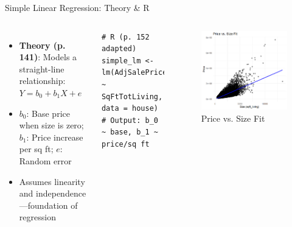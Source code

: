 \documentclass{beamer}
\begin{document}
	\begin{frame}[fragile]{Simple Linear Regression: Theory \& R}
		\begin{columns}
			\begin{itemize}
				\item \textbf{Theory (p. 141)}: Models a straight-line relationship: $Y = b_0 + b_1X + e$
				\item $b_0$: Base price when size is zero; $b_1$: Price increase per sq ft; $e$: Random error
				\item Assumes linearity and independence—foundation of regression
			\end{itemize}
			\begin{lstlisting}
# R (p. 152 adapted)
simple_lm <- lm(AdjSalePrice ~ SqFtTotLiving, data = house)
# Output: b_0 ~ base, b_1 ~ price/sq ft
			\end{lstlisting}
		\begin{figure}
			\centering
			\includegraphics[width=\textwidth]{regres1.jpg} %
			\caption{Price vs. Size Fit}
			\label{fig:price_vs_size_fit}
		\end{figure}
		\end{columns}
	\end{frame}
	
\end{document}
